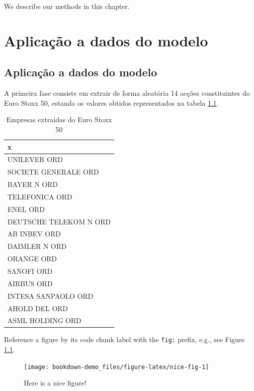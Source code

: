 \documentclass[
  12pt,
  a4paper,
  openany]{book}
\begin{document}
\newpage

We describe our methods in this chapter.

\hypertarget{aplicauxe7uxe3o-a-dados-do-modelo}{%
\chapter{Aplicação a dados do modelo}\label{aplicauxe7uxe3o-a-dados-do-modelo}}

\endgroup
\newpage

\hypertarget{aplicauxe7uxe3o-a-dados-do-modelo-1}{%
\section{Aplicação a dados do modelo}\label{aplicauxe7uxe3o-a-dados-do-modelo-1}}

A primeira fase consiste em extrair de forma aleatória 14 acções constituintes do Euro Stoxx 50, estando os valores obtidos representados na tabela \ref{tab:nice-tab}.
\scriptsize

\begin{table}[!h]

\caption{\label{tab:nice-tab}Empresas extraidas do Euro Stoxx 50}
\centering
\begin{tabular}[t]{l}
\toprule
x\\
\midrule
UNILEVER ORD\\
SOCIETE GENERALE ORD\\
BAYER N ORD\\
TELEFONICA ORD\\
ENEL ORD\\
\addlinespace
DEUTSCHE TELEKOM N ORD\\
AB INBEV ORD\\
DAIMLER N ORD\\
ORANGE ORD\\
SANOFI ORD\\
\addlinespace
AIRBUS ORD\\
INTESA SANPAOLO ORD\\
AHOLD DEL ORD\\
ASML HOLDING ORD\\
\bottomrule
\end{tabular}
\end{table}

\normalsize

Reference a figure by its code chunk label with the \texttt{fig:} prefix, e.g., see Figure \ref{fig:nice-fig}.
\scriptsize

\begin{figure}
\texttt{[image: bookdown-demo\_files/figure-latex/nice-fig-1]} \caption{Here is a nice figure!}\label{fig:nice-fig}
\end{figure}
\end{document}
